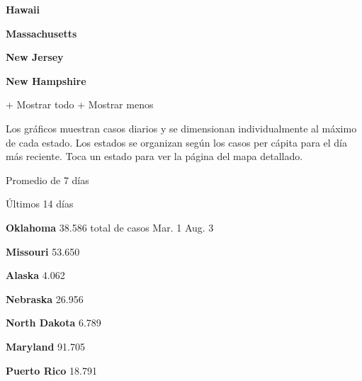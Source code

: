 \textbf{Hawaii}

\href{https://www.nytimes3xbfgragh.onion/interactive/2020/us/massachusetts-coronavirus-cases.html}{}

\textbf{Massachusetts}

\href{https://www.nytimes3xbfgragh.onion/interactive/2020/us/new-jersey-coronavirus-cases.html}{}

\textbf{New Jersey}

\href{https://www.nytimes3xbfgragh.onion/interactive/2020/us/new-hampshire-coronavirus-cases.html}{}

\textbf{New Hampshire}

+ Mostrar todo + Mostrar menos

Los gráficos muestran casos diarios y se dimensionan individualmente al
máximo de cada estado. Los estados se organizan según los casos per
cápita para el día más reciente. Toca un estado para ver la página del
mapa detallado.

\href{https://www.nytimes3xbfgragh.onion/interactive/2020/us/oklahoma-coronavirus-cases.html}{}

Promedio de 7 días

Últimos 14 días

\textbf{Oklahoma} 38.586 total de casos Mar. 1 Aug. 3

\href{https://www.nytimes3xbfgragh.onion/interactive/2020/us/missouri-coronavirus-cases.html}{}

\textbf{Missouri} 53.650

\href{https://www.nytimes3xbfgragh.onion/interactive/2020/us/alaska-coronavirus-cases.html}{}

\textbf{Alaska} 4.062

\href{https://www.nytimes3xbfgragh.onion/interactive/2020/us/nebraska-coronavirus-cases.html}{}

\textbf{Nebraska} 26.956

\href{https://www.nytimes3xbfgragh.onion/interactive/2020/us/north-dakota-coronavirus-cases.html}{}

\textbf{North Dakota} 6.789

\href{https://www.nytimes3xbfgragh.onion/interactive/2020/us/maryland-coronavirus-cases.html}{}

\textbf{Maryland} 91.705

\href{https://www.nytimes3xbfgragh.onion/interactive/2020/us/puerto-rico-coronavirus-cases.html}{}

\textbf{Puerto Rico} 18.791

\href{https://www.nytimes3xbfgragh.onion/interactive/2020/us/illinois-coronavirus-cases.html}{}

